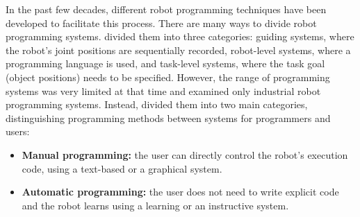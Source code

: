 In the past few decades, different robot programming techniques have been developed to facilitate this process. 
There are many ways to divide robot programming systems. 
\cite{lozano1983robot} divided them into three categories: 
guiding systems, where the robot's joint positions are sequentially recorded,
robot-level systems, where a programming language is used, and
task-level systems, where the task goal (\eg object positions) needs to be specified.
However, the range of programming systems was very limited at that time and examined only industrial robot programming systems.
Instead, \cite{Biggs2003} divided them into two main categories, distinguishing programming methods between systems for programmers and users:

\begin{itemize}
 \item {\textbf{Manual programming:} the user can directly control the robot's execution code, using a text-based or a graphical system.}
 \item {\textbf{Automatic programming:} the user does not need to write explicit code and the robot learns using a learning or an instructive system.}
\end{itemize}


